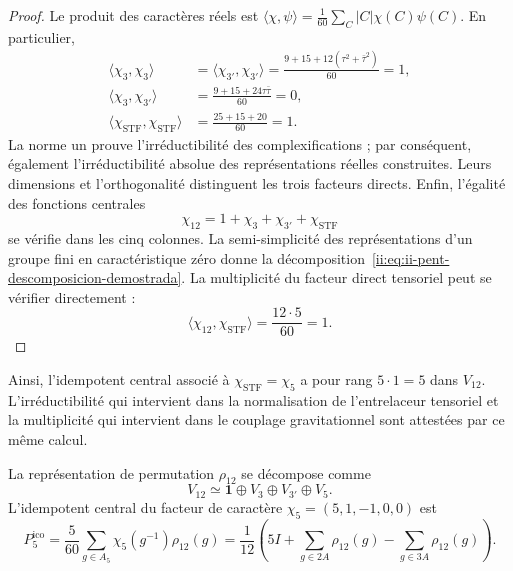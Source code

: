 \begin{proof}
Le produit des caractères réels est
\(\langle\chi,\psi\rangle
=\frac1{60}\sum_C|C|\chi(C)\psi(C)\).
En particulier,
\begin{align*}
 \langle\chi_3,\chi_3\rangle
 &=\langle\chi_{3'},\chi_{3'}\rangle
 =\frac{9+15+12(\tau^2+\bar\tau^2)}{60}=1,\\
 \langle\chi_3,\chi_{3'}\rangle
 &=\frac{9+15+24\tau\bar\tau}{60}=0,\\
 \langle\chi_{\mathrm{STF}},\chi_{\mathrm{STF}}\rangle
 &=\frac{25+15+20}{60}=1.
\end{align*}
La norme un prouve l’irréductibilité des complexifications ; par
conséquent, également l’irréductibilité absolue des représentations
réelles construites. Leurs dimensions et l’orthogonalité distinguent les
trois facteurs directs. Enfin, l’égalité des fonctions centrales
\[
 \chi_{12}=1+\chi_3+\chi_{3'}+\chi_{\mathrm{STF}}
\]
se vérifie dans les cinq colonnes. La semi-simplicité des
représentations d’un groupe fini en caractéristique zéro donne la
décomposition~\eqref{ii:eq:ii-pent-descomposicion-demostrada}. La
multiplicité du facteur direct tensoriel peut se vérifier directement :
\[
 \langle\chi_{12},\chi_{\mathrm{STF}}\rangle
 =\frac{12\cdot5}{60}=1.
\]
\end{proof}

Ainsi, l’idempotent central associé à
\(\chi_{\mathrm{STF}}=\chi_5\) a pour rang
\(5\cdot1=5\) dans \(V_{12}\). L’irréductibilité qui intervient
dans la normalisation de l’entrelaceur tensoriel et la multiplicité qui
intervient dans le couplage gravitationnel sont attestées par
ce même calcul.



La représentation de permutation \(\rho_{12}\) se décompose comme
\begin{equation}
\label{ii:ii:pent:eq:gravity-v12-decomposition}
V_{12}\simeq\mathbf1\oplus V_3\oplus V_{3'}\oplus V_5.
\end{equation}
L’idempotent central du facteur de caractère
\(\chi_5=(5,1,-1,0,0)\) est
\begin{equation}
\label{ii:ii:pent:eq:gravity-p5}
\boxed{
P^{\mathrm{ico}}_5=\frac5{60}\sum_{g\in A_5}\chi_5(g^{-1})\rho_{12}(g)
=\frac1{12}\left(
5I+\sum_{g\in2A}\rho_{12}(g)
-\sum_{g\in3A}\rho_{12}(g)
\right).}
\end{equation}

